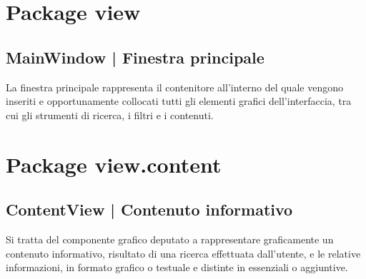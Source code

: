 \documentclass[10pt,a4paper,headinclude,footinclude,hidelinks]{scrreprt} %
\begin{document}
	\section{Package view}
	\label{sec:stage:design:sistema:view}
	
	\subsection[MainWindow]{MainWindow | Finestra principale}
	La finestra principale rappresenta il contenitore all'interno del quale vengono inseriti e opportunamente collocati tutti gli elementi grafici dell'interfaccia, tra cui gli strumenti di ricerca, i filtri e i contenuti.

	\section{Package view.content}
	\label{sec:stage:design:sistema:view.content}

	\subsection[ContentView]{ContentView | Contenuto informativo}
	Si tratta del componente grafico deputato a rappresentare graficamente un contenuto informativo, risultato di una ricerca effettuata dall'utente, e le relative informazioni, in formato grafico o testuale e distinte in essenziali o aggiuntive.
\end{document}
